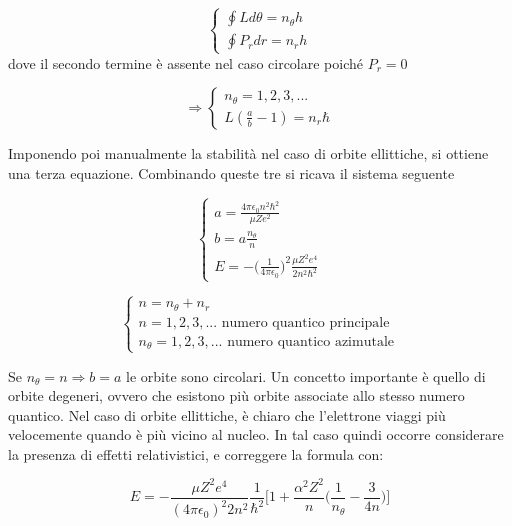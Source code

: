\begin{equation}
\begin{cases}
\oint L d\theta = n_{\theta} h \\
\oint P_r dr = n_r h
\end{cases}
\end{equation}
dove il secondo termine è assente nel caso circolare poiché $P_r=0$

\begin{equation}
\Rightarrow
\begin{cases}
n_{\theta} = 1, 2, 3, ... \\
L(\frac{a}{b} - 1) = n_r \hbar
\end{cases}
\end{equation}

Imponendo poi manualmente la stabilità nel caso di orbite ellittiche, si ottiene una terza equazione.
Combinando queste tre si ricava il sistema seguente

\begin{equation}
\begin{cases}
a = \frac{4\pi \epsilon_0 n^2 \hbar^2}{\mu Z e^2}\\
b = a \frac{n_{\theta}}{n}\\
E = - \bigl(\frac{1}{4\pi\epsilon_0}\bigr)^2 \frac{\mu Z^2 e^4}{2 n^2 \hbar^2}
\end{cases}
\end{equation}

\begin{equation}
\begin{cases}
n = n_{\theta} + n_r \\
n = 1, 2, 3, ... \mbox{ numero quantico principale} \\
n_{\theta} = 1, 2, 3, ... \mbox{ numero quantico azimutale}
\end{cases}
\end{equation}

Se $ n_{\theta} = n \Rightarrow b = a $ le orbite sono circolari.
Un concetto importante è quello di orbite degeneri, ovvero che esistono più orbite associate allo stesso numero quantico.
Nel caso di orbite ellittiche, è chiaro che l'elettrone viaggi più velocemente quando è più vicino al nucleo.
In tal caso quindi occorre considerare la presenza di effetti relativistici, e correggere la formula con:

$$ E = - \frac{\mu Z^2 e^4}{(4\pi\epsilon_0)^2 2 n^2} \frac{1}{\hbar^2} \biggl[ 1 + \frac{\alpha^2 Z^2}{n} \biggl( \frac{1}{n_{\theta}} - \frac{3}{4n}  \biggr)  \biggr] $$

